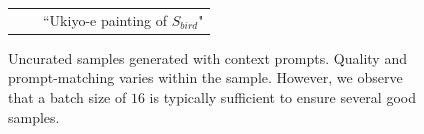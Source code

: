 \begin{figure}[!hbt]
{\begin{tabular}{c@{\hskip 5pt} c@{\hskip 5pt} c}
         & & {``Ukiyo-e painting of {\color[HTML]{EF5675}$S_{bird}$}"} \\
        
        

    \end{tabular}}
    \caption{Uncurated samples generated with context prompts. Quality and prompt-matching varies within the sample. However, we observe that a batch size of $16$ is typically sufficient to ensure several good samples.}
    \label{fig:uncurated_prompt_1} 
\end{figure}